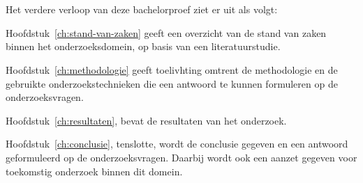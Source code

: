 \section{}%
\label{sec:opzet-bachelorproef}


Het verdere verloop van deze bachelorproef ziet er uit als volgt:

Hoofdstuk~\ref{ch:stand-van-zaken} geeft een overzicht van de stand van zaken binnen het onderzoeksdomein, op basis van een literatuurstudie.

Hoofdstuk~\ref{ch:methodologie} geeft toelivhting omtrent de methodologie en de gebruikte onderzoekstechnieken die een antwoord te kunnen formuleren op de onderzoeksvragen.

Hoofdstuk~\ref{ch:resultaten}, bevat de resultaten van het onderzoek.

Hoofdstuk~\ref{ch:conclusie}, tenslotte, wordt de conclusie gegeven en een antwoord geformuleerd op de onderzoeksvragen. Daarbij wordt ook een aanzet gegeven voor toekomstig onderzoek binnen dit domein.